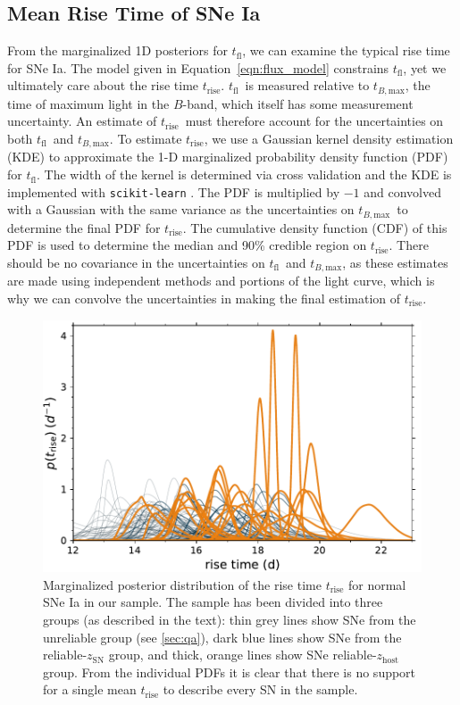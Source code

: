 \documentclass[twocolumn]{./aastex63}
\newcommand{\tfl}{$t_\mathrm{fl}$}
\newcommand{\trise}{$t_\mathrm{rise}$}
\newcommand{\tbmax}{$t_{B,\mathrm{max}}$}
\begin{document}
\subsection{Mean Rise Time of SNe Ia}\label{sec:mean_rise}

From the marginalized 1D posteriors for \tfl, we can examine the typical rise
time for SNe Ia. The model given in Equation~\ref{eqn:flux_model} constrains
\tfl, yet we ultimately care about the rise time \trise. \tfl\ is measured
relative to \tbmax, the time of maximum light in the $B$-band, which itself
has some measurement uncertainty. An estimate of \trise\ must therefore
account for the uncertainties on both \tfl\ and \tbmax. To estimate \trise,
we use a Gaussian kernel density estimation (KDE) to approximate the 1-D
marginalized probability density function (PDF) for \tfl. The width of the
kernel is determined via cross validation and the KDE is implemented with
\texttt{scikit-learn} \citep{Pedregosa11}. The PDF is multiplied by $-1$ and
convolved with a Gaussian with the same variance as the uncertainties on
\tbmax\ to determine the final PDF for \trise. The cumulative
density function (CDF) of this PDF is used to determine the median and 90\%
credible region on \trise. There should be no covariance in the uncertainties
on \tfl\ and \tbmax, as these estimates are made using independent methods
and portions of the light curve, which is why we can convolve the
uncertainties in making the final estimation of \trise.

\begin{figure}
    \centering
    \includegraphics[width=1\linewidth]{./figures/rise_time.pdf}
    \caption{Marginalized posterior distribution of the rise time
    $t_\mathrm{rise}$ for normal SNe Ia in our sample. The sample has been
    divided into three groups (as described in the text): thin grey lines show
    SNe from the unreliable group (see \ref{sec:qa}), dark blue lines show
    SNe from the reliable-$z_\mathrm{SN}$ group, and thick, orange lines show
    SNe reliable-$z_\mathrm{host}$ group. From the individual PDFs it is
    clear that there is no support for a single mean $t_\mathrm{rise}$ to
    describe every SN in the sample.}
    \label{fig:rise_time}
\end{figure}
\end{document}
